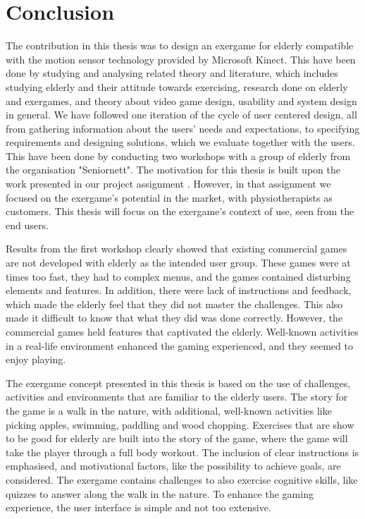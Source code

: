 \chapter{Conclusion}

The contribution in this thesis was to design an exergame for elderly compatible with the motion sensor technology provided by Microsoft Kinect. This have been done by studying and analysing related theory and literature, which includes studying elderly and their attitude towards exercising, research done on elderly and exergames, and theory about video game design, usability and system design in general. We have followed one iteration of the cycle of user centered design, all from gathering information about the users' needs and expectations, to specifying requirements and designing solutions, which we evaluate together with the users. This have been done by conducting two workshops with a group of elderly from the organisation "Seniornett". The motivation for this thesis is built upon the work presented in our project assignment \cite{project}. However, in that assignment we focused on the exergame's potential in the market, with physiotherapists as customers. This thesis will focus on the exergame's context of use, seen from the end users. 

Results from the first workshop clearly showed that existing commercial games are not developed with elderly as the intended user group. These games were at times too fast, they had to complex menus, and the games contained disturbing elements and features. In addition, there were lack of instructions and feedback, which made the elderly feel that they did not master the challenges. This also made it difficult to know that what they did was done correctly. However, the commercial games held features that captivated the elderly. Well-known activities in a real-life environment enhanced the gaming experienced, and they seemed to enjoy playing.     

The exergame concept presented in this thesis is based on the use of challenges, activities and environments that are familiar to the elderly users. The story for the game is a walk in the nature, with additional, well-known activities like picking apples, swimming, paddling and wood chopping. Exercises that are show to be good for elderly are built into the story of the game, where the game will take the player through a full body workout. The inclusion of clear instructions is emphasised, and motivational factors, like the possibility to achieve goals, are considered. The exergame contains challenges to also exercise cognitive skills, like quizzes to answer along the walk in the nature. To enhance the gaming experience, the user interface is simple and not too extensive.

